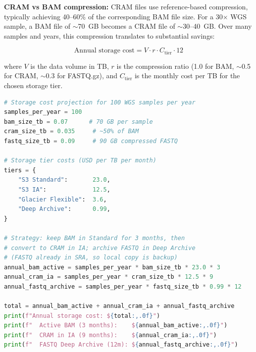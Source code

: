 \textbf{CRAM vs BAM compression:} CRAM files use reference-based compression, typically achieving 40--60\% of the corresponding BAM file size. For a 30$\times$ WGS sample, a BAM file of $\sim$70~GB becomes a CRAM file of $\sim$30--40~GB. Over many samples and years, this compression translates to substantial savings:

\begin{equation}
\label{eq:storage-cost}
\text{Annual storage cost} = V \cdot r \cdot C_{\text{tier}} \cdot 12
\end{equation}

where $V$ is the data volume in TB, $r$ is the compression ratio (1.0 for BAM, $\sim$0.5 for CRAM, $\sim$0.3 for FASTQ.gz), and $C_{\text{tier}}$ is the monthly cost per TB for the chosen storage tier.

\begin{lstlisting}[language=Python,caption={Storage cost projection for a sequencing facility.},label=lst:storage-cost]
# Storage cost projection for 100 WGS samples per year
samples_per_year = 100
bam_size_tb = 0.07      # 70 GB per sample
cram_size_tb = 0.035     # ~50% of BAM
fastq_size_tb = 0.09     # 90 GB compressed FASTQ

# Storage tier costs (USD per TB per month)
tiers = {
    "S3 Standard":       23.0,
    "S3 IA":             12.5,
    "Glacier Flexible":  3.6,
    "Deep Archive":      0.99,
}

# Strategy: keep BAM in Standard for 3 months, then
# convert to CRAM in IA; archive FASTQ in Deep Archive
# (FASTQ already in SRA, so local copy is backup)
annual_bam_active = samples_per_year * bam_size_tb * 23.0 * 3
annual_cram_ia = samples_per_year * cram_size_tb * 12.5 * 9
annual_fastq_archive = samples_per_year * fastq_size_tb * 0.99 * 12

total = annual_bam_active + annual_cram_ia + annual_fastq_archive
print(f"Annual storage cost: ${total:,.0f}")
print(f"  Active BAM (3 months):    ${annual_bam_active:,.0f}")
print(f"  CRAM in IA (9 months):    ${annual_cram_ia:,.0f}")
print(f"  FASTQ Deep Archive (12m): ${annual_fastq_archive:,.0f}")
\end{lstlisting}

